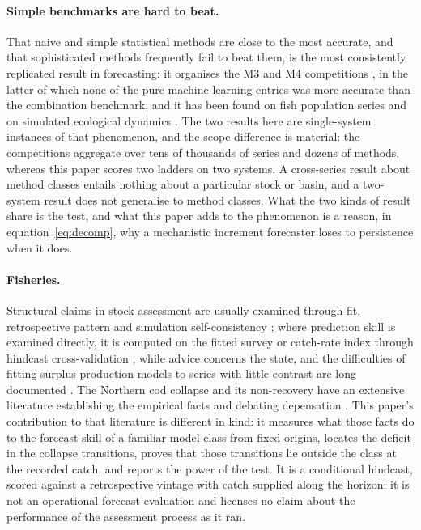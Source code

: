 \documentclass[preprint,11pt,authoryear]{elsarticle}
\theoremstyle{definition}
\theoremstyle{remark}
\begin{document}
\paragraph{Simple benchmarks are hard to beat.} That naive and simple statistical methods are close to the most accurate, and that sophisticated methods frequently fail to beat them, is the most consistently replicated result in forecasting: it organises the M3 and M4 competitions \citep{Makridakis2000,Makridakis2018}, in the latter of which none of the pure machine-learning entries was more accurate than the combination benchmark, and it has been found on fish population series \citep{Ward2014} and on simulated ecological dynamics \citep{Perretti2013}. The two results here are single-system instances of that phenomenon, and the scope difference is material: the competitions aggregate over tens of thousands of series and dozens of methods, whereas this paper scores two ladders on two systems. A cross-series result about method classes entails nothing about a particular stock or basin, and a two-system result does not generalise to method classes. What the two kinds of result share is the test, and what this paper adds to the phenomenon is a reason, in equation~\eqref{eq:decomp}, why a mechanistic increment forecaster loses to persistence when it does.

\paragraph{Fisheries.} Structural claims in stock assessment are usually examined through fit, retrospective pattern and simulation self-consistency \citep{HilbornWalters1992,Punt2016,Maunder2015}; where prediction skill is examined directly, it is computed on the fitted survey or catch-rate index through hindcast cross-validation \citep{Kell2016,Kell2021,Carvalho2021,Kokkalis2024}, while advice concerns the state, and the difficulties of fitting surplus-production models to series with little contrast are long documented \citep{HilbornWalters1992,LudwigWalters1985,Polacheck1993,Punt2003,PedersenBerg2017}. The Northern cod collapse and its non-recovery have an extensive literature establishing the empirical facts \citep{Hutchings1994,Myers1997,Walters1996,Hutchings2005,RoseRowe2015,RoseWalters2019,Rose2026} and debating depensation \citep{Shelton1999,Hutchings1996,Myers1995,Liermann1997}. This paper's contribution to that literature is different in kind: it measures what those facts do to the forecast skill of a familiar model class from fixed origins, locates the deficit in the collapse transitions, proves that those transitions lie outside the class at the recorded catch, and reports the power of the test. It is a conditional hindcast, scored against a retrospective vintage with catch supplied along the horizon; it is not an operational forecast evaluation and licenses no claim about the performance of the assessment process as it ran.
\end{document}
